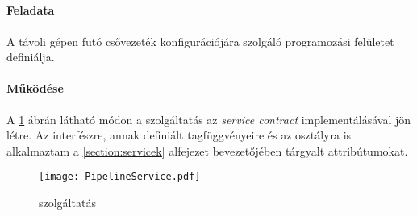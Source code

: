 \subsection{} \label{subs:pipeline_service}

\paragraph{Feladata} A távoli gépen futó csővezeték konfigurációjára szolgáló programozási felületet definiálja. 

\paragraph{Működése} A \ref{fig:PipelineService_class} ábrán látható módon a szolgáltatás az  \emph{service contract} implementálásával jön létre. Az interfészre, annak definiált tagfüggvényeire és az osztályra is alkalmaztam a \ref{section:servicek} alfejezet bevezetőjében tárgyalt attribútumokat.

\begin{figure}[h]
\vspace{.5cm}
\texttt{[image: PipelineService.pdf]}
\centering
\vspace{.2cm}
\caption{ szolgáltatás}
\vspace{.5cm}
\label{fig:PipelineService_class}
\end{figure}

